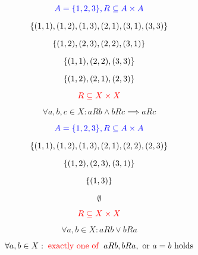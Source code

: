 \begin{frame}{}
  \[
    \textcolor{blue}{A = \{1, 2, 3\}, R \subseteq A \times A}
  \]

  \[
    \{(1, 1), (1, 2), (1, 3), (2, 1), (3, 1), (3, 3)\}
  \]

  \pause
  \[
    \{(1, 2), (2, 3), (2, 2), (3, 1)\}
  \]

  \pause
  \[
    \{(1, 1), (2, 2), (3, 3)\}
  \]

  \pause
  \[
    \{(1, 2), (2, 1), (2, 3)\}
  \]
\end{frame}

\begin{frame}{}
  \[
    \textcolor{red}{R \subseteq X \times X}
  \]

  \begin{definition}[Transitive]
    \[
      \forall a, b, c \in X: a R b \land b R c \implies a R c
    \]

  \end{definition}
\end{frame}

\begin{frame}{}
  \[
    \textcolor{blue}{A = \{1, 2, 3\}, R \subseteq A \times A}
  \]

  \[
    \{(1, 1), (1, 2), (1, 3), (2, 1), (2, 2), (2, 3)\}
  \]

  \pause
  \[
    \{(1, 2), (2, 3), (3, 1)\}
  \]

  \pause
  \[
    \{(1, 3)\}
  \]

  \pause
  \[
    \emptyset
  \]
\end{frame}

\begin{frame}{}
  \[
    \textcolor{red}{R \subseteq X \times X}
  \]

  \begin{definition}[Connex]
    \[
      \forall a, b \in X: a R b \lor b R a
    \]
  \end{definition}

  \pause
  \vspace{0.60cm}
  \begin{definition}[Trichotomous]
    \[
      \forall a, b \in X:\; \text{\textcolor{red}{exactly one of }}\; a R b, b R a, \text{ or } a = b \text{ holds}
    \]
  \end{definition}
\end{frame}

